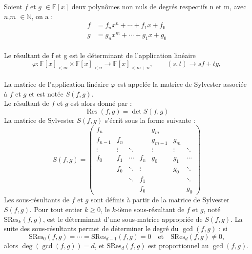 \documentclass{article}
\begin{document}
Soient $f$ et $g$ $\in \mathbb{F}[x]$ deux polynômes non nuls de degrés respectifs
n et m, avec $n$,$m$ $\in \mathbb{N}$, on a :
\[
\begin{aligned}
    f &= f_nx^n+\cdots+f_1x+f_0 \\
    g &= g_nx^m+\cdots+g_1x+g_0
\end{aligned}
\]
\\
Le résultant de f et g est le déterminant de l'application linéaire 
\[
\varphi :
\mathbb{F}[x]_{<m} \times \mathbb{F}[x]_{<n}
\longrightarrow
\mathbb{F}[x]_{<m+n},
\qquad
(s,t) \longrightarrow sf + tg,
\]
\\
La matrice de l'application linéaire $\varphi$ est appelée la matrice de Sylvester associée à $f$ et $g$ et est notée $S(f,g)$.
\\
Le résultant de $f$ et $g$ est alors donné par :
\[
\operatorname{Res}(f,g)=\det S(f,g)
\]
La matrice de Sylvester $S(f,g)$ s'écrit sous la forme suivante :
\[
S(f,g)=
\begin{pmatrix}
f_n &        &        &        & g_m &        &        \\
f_{n-1} & f_n &        &        & g_{m-1} & g_m &        \\
\vdots & \vdots & \ddots &        & \vdots & \vdots & \ddots \\
f_0 & f_1 & \cdots & f_n & g_0 & g_1 & \cdots \\
    & f_0 & \ddots & \vdots &     & g_0 & \ddots \\
    &     & \ddots & f_1 &     &     & \ddots \\
    &     &        & f_0 &     &     & g_0
\end{pmatrix}
\]
Les sous-résultants de $f$ et $g$ sont définis à partir de la matrice de
Sylvester $S(f,g)$.
Pour tout entier $k \ge 0$, le $k$-ième sous-résultant de $f$ et $g$,
noté $\mathrm{SRes}_k(f,g)$, est le déterminant d’une sous-matrice
appropriée de $S(f,g)$.
La suite des sous-résultants permet de déterminer le degré du
$\gcd(f,g)$ : si
\[
\mathrm{SRes}_0(f,g)=\cdots=\mathrm{SRes}_{d-1}(f,g)=0
\quad \text{et} \quad
\mathrm{SRes}_d(f,g)\neq 0,
\]
alors $\deg(\gcd(f,g))=d$, et $\mathrm{SRes}_d(f,g)$ est proportionnel
au $\gcd(f,g)$.
\end{document}
